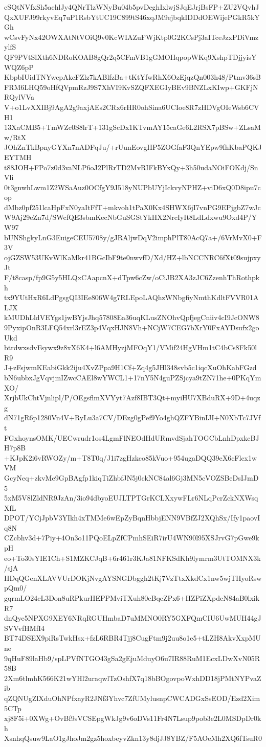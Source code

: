 cSQtNVfxSh5aehlJy4QNrTlzWNyBu04b5pvDeghIxlwjSJqEJrjBsFP+ZU2VQvhJ
QxXUFJ99rkyvEq7uP1RsbYtUC19C899tS46xqJM9ejbqkIDDdOEWijePGkR5kYGh
wCsvFyNx42OWXAtNtVOiQ9v0KcWIAZuFWjKtp0G2KCsPj3aITceJzxPDiVmzylfS
QF9PVtSlXth6NDRoKOAB8gQr2q5CFmVB1gGMOHqpopWKq9XshpTDjjyisYWQZ6pP
KbpbIUidTNYwcpAkcFZlz7kABlfzBa+tKtYfwRhX6OzEjqzQn003h48/Ptmv36sB
FRM6LHQ59oHfQVpmRzJ9S7XhVI9KvSZQFXEGIyBEv9BNZLxKIwp+GKFjNRQylVVa
V+o1LvXXIBj9AgA2g9axjAEs2CRx6rHR0ohSina6UCIoe8R7zHDVgOIeWsb6CVH1
13XaCMB5+TmWZc0S8lrT+131gScDx1KTvmAY15caGe6L2RSX7pBSw+ZLsaMw/RtX
JOhZnTkBpnyGYXn7nADFqJu/+rUunEovgHP5ZOGfaF3QnYEpw9fhKbaPQKJEYTMH
t88JOH+FPo7z0d3vaNLP6oJ2PlRrTD2MvRIFkBYxQy+3h50udaNOiFOKdj/SnVli
0t3gnwhLwm1Z2WSaAuz0OCfgY9J518yNUPbUYjIckvyNPHZ+viD6xQ0D8ipu7cop
dMbz0pf251lcaHpFxN0yaItFfT+mkvoh1tPaX0Kx4SHWX6jI7vnPG9EPjgbZ7wJc
W9Aj29eZn7d/SWcfQE3sbmKecNbGuSGStYkHX2NrcIyIt8LdLdxwu9Oxd4P/YW97
bUNShgkyLnG3EuigeCEU5708y/gJRAljwDqV2imphPlT80AcQ7a+/6VrMvX0+F3V
ojGZSW53UKvWlKaMkr41BGcIbF9te0nwvfD/Xd/HZ+lbNCCNRC6fXt09sujpxyJt
F/t8casp/fp9G5y5HLQxCAapcnX+dTpw6cZw/oCiJB2XA3zJC6ZzenhThRothpkh
tx9YUtHxR6LdPgsgQI3IEe806W4g7RLEpoLAQhzWNbgfiyNmthKdltFVVR01ALJX
kMUDhLldVEYgs1jwBYjsJhq57808Ea36uqKLusZNOhvQpfjegCniiv4cI9JcONW8
9PyxipOnR3LFQ54xrl3rEZ3p4VqxHJN8Vh+NCjW7CEG7bXrY0FxAYDsufx2goUkd
btrdwxsdvFsywx9z8xX6K4+l6AMHyzjMFOqY1/VMif24HgVHm1tC4bCs8Fk50lR9
J+zFsjwmKEabiGkk2iju4XvZPpa9H1Cf+Zq4g5JHl348svb5c1iqcXuOhKabFGzd
bN6ubbxJgVqvjmIZwcCAEl8wYWCL1+17nY5N4guPZSjcya9tZN71he+0PKqYmXO/
XrjbUkChtVjnlipl/P/OEgsflmXVYyt7Azf8IBT3Qt+myiHU7XBduRX+9D+4uqzg
dN71gR6p1280Vn4V+RyLu3a7CV/DEzg0gPef9Yo4ghQZFYBinIJI+N0XbTc7JVft
FGxhoynsOMK/UECwrudr1os4LgmFlNEOdHdURmvdSjahTOGCbLnhDpxkcBJH7p8B
+KJpK2i6vRWOZy/m+T8T0q/J1i7zgHzkco85kVuo+954ugaDQQ39eX6cFlcx1wVM
GcyNeq+zkvMe9GpBAgfp1kiqTiZhbfJN5j0ckNC84al6Gj3MN5cVOZSBeDsIJmD5
5xM5V8lZldNR9JzAn/3io94dbyoEUJLTPTGrKCLXxywFLr6NLqPcrZckNXWsqXfL
DPOT/YCjJpbV3YIkh4xTMMe6wEpZyBqnHbbjENN9VBfZJ2XQhSx/Ify1paovIq8N
CZcbhv3d+7Piy+4On3o11PQoELpZfCPmhSEiR7irU4WN90l95XSJrvG7pGwe9kpH
eo+To30sYIE1Ch+S1MZKCJqB+6r461r3KJa81NFKSdKh9lymrm3UtTOMNX3k/sjA
HDqQGenXLAVVUrDOKjNvgAYSNGDbggh2tKj7VzTtxXkdCx1nw5wjTHyoRswpQm0/
gqrmLO24cL3Don8uRPkurHEPPMviTXuh80eBqeZPx6+HZPiZXpdcN84aB0lxikR7
dnQye5NPXG9XEY6NRqRGUHmbaD7uMMNO0RY5GXFQmCIU6UwMUH44gJSVVvfHMfI4
BT74DSEX9piRsTwkHsx+fzL6RBR4Tjj8CugFtm9j2uu8o1e5+tLZH8AkvXxpMUne
9qHuF89laHb9/spLPVfNTGO43gSa2gEjuMduyO6u7IR88RuM1EcxLDwXvN05R58B
2Xm6tlmhK566K21wYHl2uraqwlTzOshfX7q18bBOgovpoWxhDD18jPMtNYPvaZib
qZQNUgZlXduOhNPfxayR2JNf3Yhvc7ZfUMylusnpCWCADGxSsEOD/Ezd2Xim5CTp
xj8F5i+0XWg+OvBf9sVCSEpgWkJg9v6oDVs11Fr4N7Lsup9pob3e2L0MSDpDr0kh
XsnhqQsuw9LaO1gJhoJm2gz5hoxbeyvZkn13y8djJJ8YBZ/F5AOeMh2XQ6fTsuR0
